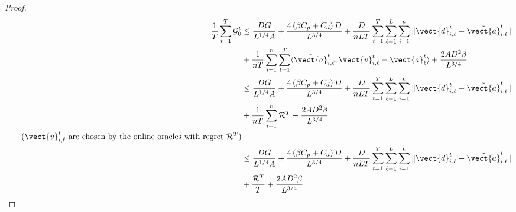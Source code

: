 \begin{proof}
\begin{align*}
    \frac{1}{T}\sum_{t=1}^{T} \mathcal{G}_0^t  
    &\leq \frac{DG}{L^{1/4}A} + \frac{4\left(\beta C_p + C_d\right)D}{L^{3/4}} + \frac{D}{nLT} \sum_{t=1}^{T} \sum_{\ell=1}^{L} \sum_{i=1}^{n} \| \vect{d}^t_{i,\ell} - \Tilde{\vect{a}}^{t}_{i, \ell} \| \\
    &+  \frac{1}{nT} \sum_{i=1}^{n} \sum_{t=1}^{T}\langle \Tilde{\vect{a}}^{t}_{i, \ell}, \vect{v}^t_{i,\ell} - \vect{a}^{t}_{\ell} \rangle + \frac{2AD^2\beta}{L^{3/4}}\\
    &\leq \frac{DG}{L^{1/4}A} + \frac{4\left(\beta C_p + C_d\right)D}{L^{3/4}} + \frac{D}{nLT} \sum_{t=1}^{T} \sum_{\ell=1}^{L} \sum_{i=1}^{n} \| \vect{d}^t_{i,\ell} - \Tilde{\vect{a}}^{t}_{i, \ell} \| \\
    &+  \frac{1}{nT} \sum_{i=1}^{n} \mathcal{R}^T + \frac{2AD^2\beta}{L^{3/4}}\\
    \tag{$\vect{v}^t_{i,\ell}$ are chosen by the online oracles with regret $\mathcal{R}^T$} 
    \\
    &\leq \frac{DG}{L^{1/4}A} + \frac{4\left(\beta C_p + C_d\right)D}{L^{3/4}} + \frac{D}{nLT} \sum_{t=1}^{T} \sum_{\ell=1}^{L} \sum_{i=1}^{n} \| \vect{d}^t_{i,\ell} - \Tilde{\vect{a}}^{t}_{i, \ell} \| \\
    &+ \frac{\mathcal{R}^T}{T} + \frac{2AD^2\beta}{L^{3/4}}
\end{align*}
     

\end{proof}
